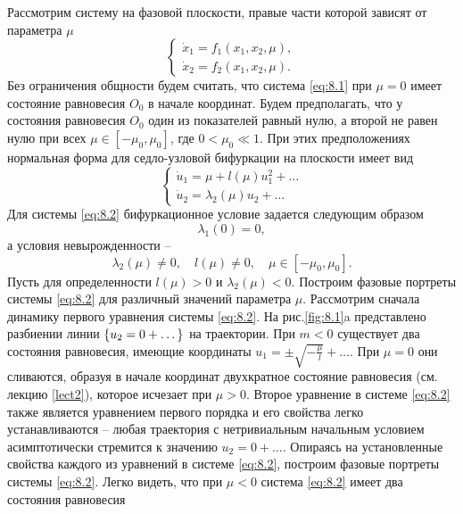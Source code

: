 Рассмотрим систему на фазовой плоскости, правые части которой зависят от параметра $\mu$
 \begin{equation}
        \label{eq:8.1}
        \begin{cases}
                \dot x_1 = f_1(x_1,x_2,\mu),\\
                \dot x_2 = f_2(x_1,x_2,\mu). 
        \end{cases}
\end{equation}
Без ограничения общности будем считать, что система \eqref{eq:8.1} при $\mu=0$ имеет
состояние равновесия $O_0$ в начале координат. Будем предполагать, что у
состояния равновесия $O_0$ один из показателей равный нулю, а второй не равен
нулю при всех $\mu \in [-\mu_0,\mu_0]$, где $0<\mu_0\ll 1$.
 При этих предположениях
нормальная форма для седло-узловой бифуркации на плоскости имеет вид
\begin{equation}
        \label{eq:8.2}
        \begin{cases}
           \dot u_1 = \mu + l(\mu) u_1^2 + \dots\\
           \dot u_2 = \lambda_2(\mu) u_2 + \dots 
        \end{cases}
\end{equation}
Для системы \eqref{eq:8.2} бифуркационное условие задается следующим образом
\begin{equation}
        \label{eq:8.3}
        \lambda_1(0)=0,
\end{equation}
а условия невырожденности --
\begin{equation}
        \label{eq:8.4}
        \lambda_2(\mu) \neq 0, \quad l(\mu) \neq 0, \quad \mu \in [-\mu_0,\mu_0].
\end{equation}
Пусть для определенности $l( \mu) > 0$ и $\lambda_2(\mu)<0$. Построим фазовые портреты системы \eqref{eq:8.2} для различный значений параметра $\mu$. Рассмотрим сначала динамику первого уравнения 
системы \eqref{eq:8.2}. На рис.\ref{fig:8.1}a представлено разбиении линии $\qty{ u_2= 0+ \dots}$ на траектории. При $m<0$ существует два состояния равновесия, имеющие координаты $u_1 = \pm \sqrt{- \frac{\mu}{l}} + \dots$. При $\mu=0$ они сливаются, образуя в начале координат двухкратное состояние
равновесия (см. лекцию \ref{lect2}), которое исчезает при $\mu>0$. Второе уравнение в системе \eqref{eq:8.2} также является уравнением первого порядка и его свойства легко устанавливаются -- любая траектория с нетривиальным начальным условием асимптотически стремится к значению $u_2=0+\dots$. Опираясь на установленные свойства каждого из уравнений в системе \eqref{eq:8.2}, построим фазовые портреты системы \eqref{eq:8.2}. Легко видеть, что при $\mu<0$ система \eqref{eq:8.2} имеет два состояния равновесия
